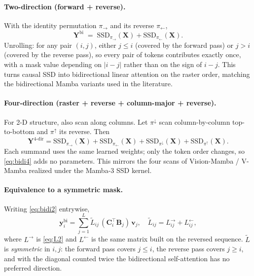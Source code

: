 \documentclass[11pt,a4paper]{article}
\begin{document}
\paragraph{Two-direction (forward + reverse).} With the identity
permutation $\pi_\to$ and its reverse $\pi_\leftarrow$,
\begin{equation}\label{eq:bidi2}
  \bm{Y}^{\text{bi}}
   \;=\; \mathrm{SSD}_{\pi_\to}(\bm{X}) + \mathrm{SSD}_{\pi_\leftarrow}(\bm{X}).
\end{equation}
Unrolling: for any pair $(i,j)$, either $j\le i$ (covered by the
forward pass) or $j>i$ (covered by the reverse pass), so every pair
of tokens contributes exactly once, with a mask value depending on
$|i-j|$ rather than on the sign of $i-j$. This turns causal SSD into
bidirectional linear attention on the raster order, matching the
bidirectional Mamba variants used in the literature.

\paragraph{Four-direction (raster + reverse + column-major + reverse).}
For 2-D structure, also scan along columns. Let $\pi^\downarrow$ scan
column-by-column top-to-bottom and $\pi^\uparrow$ its reverse. Then
\begin{equation}\label{eq:bidi4}
  \bm{Y}^{\text{4-dir}}
   = \mathrm{SSD}_{\pi_\to}(\bm{X}) + \mathrm{SSD}_{\pi_\leftarrow}(\bm{X})
   + \mathrm{SSD}_{\pi^\downarrow}(\bm{X}) + \mathrm{SSD}_{\pi^\uparrow}(\bm{X}).
\end{equation}
Each summand uses the same learned weights; only the token order
changes, so \eqref{eq:bidi4} adds no parameters. This mirrors the
four scans of Vision-Mamba / V-Mamba realized under the Mamba-3 SSD
kernel.

\paragraph{Equivalence to a symmetric mask.} Writing
\eqref{eq:bidi2} entrywise,
\begin{equation}\label{eq:bidi-sym}
  \bm{y}_i^{\text{bi}} = \sum_{j=1}^{L} \widetilde{L}_{ij}\,
       (\bm{C}_i^\top\bm{B}_j)\,\bm{v}_j,
  \quad
  \widetilde{L}_{ij} = L_{ij}^{\to} + L_{ij}^{\leftarrow},
\end{equation}
where $L^\to$ is \eqref{eq:L2} and $L^\leftarrow$ is the same matrix
built on the reversed sequence. $\widetilde{L}$ is \emph{symmetric} in
$i,j$: the forward pass covers $j\le i$, the reverse pass covers
$j\ge i$, and with the diagonal counted twice the bidirectional
self-attention has no preferred direction.
\end{document}
